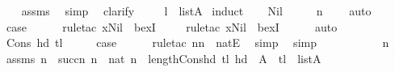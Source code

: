 \begin{isabellebody}
\ \ \isamarkupfalse%
\ assms\ \isamarkupfalse%
\ simp\ \isamarkupfalse%
\ clarify\ \isanewline
\ \ \isamarkupfalse%
\ {\isacartoucheopen}l\ {\isasymin}\ list{\isacharparenleft}{\kern0pt}A{\isacharparenright}{\kern0pt}{\isacartoucheclose}\isanewline
{}\isamarkupfalse%
\ {\isacharparenleft}{\kern0pt}induct{\isacharparenright}{\kern0pt}\isanewline
\ \ \isamarkupfalse%
\ Nil\isanewline
\ \ \isamarkupfalse%
\ \isamarkupfalse%
\ {\isachardoublequoteopen}n\ {\isacharequal}{\kern0pt}\ {}{\isachardoublequoteclose}\ \isamarkupfalse%
\ auto\ \ \isanewline
\ \ \isamarkupfalse%
\ \isamarkupfalse%
\ {\isacharquery}{\kern0pt}case\ \isanewline
\ \ \ \ \isamarkupfalse%
{\isacharparenleft}{\kern0pt}rule{\isacharunderscore}{\kern0pt}tac\ x{\isacharequal}{\kern0pt}Nil\ \ bexI{\isacharparenright}{\kern0pt}\isanewline
\ \ \ \ \isamarkupfalse%
{\isacharparenleft}{\kern0pt}rule{\isacharunderscore}{\kern0pt}tac\ x{\isacharequal}{\kern0pt}Nil\ \ bexI{\isacharparenright}{\kern0pt}\isanewline
\ \ \ \ \isamarkupfalse%
\ auto\ \isanewline
{}\isamarkupfalse%
\isanewline
\ \ \isamarkupfalse%
\ {\isacharparenleft}{\kern0pt}Cons\ hd\ tl{\isacharparenright}{\kern0pt}\isanewline
\ \ \isamarkupfalse%
\ \isamarkupfalse%
\ {\isacharquery}{\kern0pt}case\ \isanewline
\ \ \ \ \isamarkupfalse%
{\isacharparenleft}{\kern0pt}rule{\isacharunderscore}{\kern0pt}tac\ n{\isacharequal}{\kern0pt}n\ \ natE{\isacharparenright}{\kern0pt}\ \isamarkupfalse%
\ simp\ \isamarkupfalse%
\ simp\isanewline
\ \ \isamarkupfalse%
\ {\isacharminus}{\kern0pt}\ \isanewline
\ \ \ \ \isamarkupfalse%
\ n{\isacharprime}{\kern0pt}\ \isamarkupfalse%
\ assms{}{\isacharcolon}{\kern0pt}\ {\isachardoublequoteopen}n\ {\isacharequal}{\kern0pt}\ succ{\isacharparenleft}{\kern0pt}n{\isacharprime}{\kern0pt}{\isacharparenright}{\kern0pt}{\isachardoublequoteclose}\ {\isachardoublequoteopen}n{\isacharprime}{\kern0pt}\ {\isasymin}\ nat{\isachardoublequoteclose}\ {\isachardoublequoteopen}n\ {\isasymle}\ length{\isacharparenleft}{\kern0pt}Cons{\isacharparenleft}{\kern0pt}hd{\isacharcomma}{\kern0pt}\ tl{\isacharparenright}{\kern0pt}{\isacharparenright}{\kern0pt}{\isachardoublequoteclose}\ {\isachardoublequoteopen}hd\ {\isasymin}\ A\ {\isachardoublequoteclose}\ {\isachardoublequoteopen}tl\ {\isasymin}\ list{\isacharparenleft}{\kern0pt}A{\isacharparenright}{\kern0pt}{\isachardoublequoteclose}\ \isanewline

\end{isabellebody}
